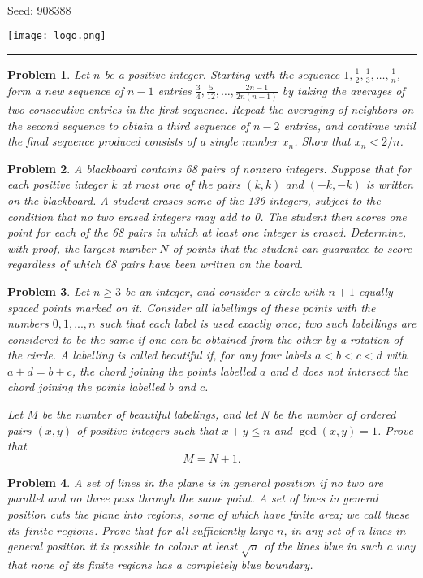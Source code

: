 \documentclass[12pt]{article}
\newtheorem{opg}{Problem}
\begin{document}
\parbox{0.6\textwidth}{ \\[2ex] {\Large Seed: 908388}}
\parbox{0.4\textwidth}{\texttt{[image: logo.png]}}

\hrule

\begin{opg}
Let  $n$  be a positive integer. Starting with the sequence
$1, \frac{1}{2}, \frac{1}{3}, \dots, \frac{1}{n}$,
form a new sequence of  $n-1$  entries
$\frac{3}{4}, \frac{5}{12}, \dots, \frac{2n-1}{2n(n-1)}$
by taking the averages of
two consecutive entries in the first sequence. Repeat the
averaging of neighbors on the second sequence to obtain a third
sequence of  $n-2$  entries, and continue until the final sequence produced
consists of a single number  $x_n$.  Show that  $x_n < 2/n$.

\end{opg}
\begin{opg}
A blackboard contains 68 pairs of nonzero integers.  Suppose that for each positive integer $k$ at most one of the pairs $(k, k)$ and $(-k, -k)$ is written on the blackboard.  A student erases some of the 136 integers, subject to the condition that no two erased integers may add to 0.  The student then scores one point for each of the 68 pairs in which at least one integer is erased.  Determine, with proof, the largest number $N$ of points that the student can guarantee to score regardless of which 68 pairs have been written on the board.


\end{opg}
\begin{opg}
Let $n \ge 3$ be an integer, and consider a circle with $n + 1$ equally spaced points marked on it. Consider all labellings of these points with the numbers $0, 1, ... , n$ such that each label is used exactly once; two such labellings are considered to be the same if one can be obtained from the other by a rotation of the circle. A labelling is called beautiful if, for any four labels $a < b < c < d$ with $a + d = b + c$, the chord joining the points labelled $a$ and $d$ does not intersect the chord joining the points labelled $b$ and $c$.

Let $M$ be the number of beautiful labelings, and let N be the number of ordered pairs $(x, y)$ of positive integers such that $x + y \le n$ and $\gcd(x, y) = 1$. Prove that \[M = N + 1.\]


\end{opg}
\begin{opg}
A set of lines in the plane is in $\textit{general position}$ if no two are parallel and no three pass through the same point. A set of lines in general position cuts the plane into regions, some of which have finite area; we call these its $\textit{finite regions}$. Prove that for all sufficiently large $n$, in any set of $n$ lines in general position it is possible to colour at least $\sqrt{n}$ of the lines blue in such a way that none of its finite regions has a completely blue boundary.


\end{opg}
\end{document}
